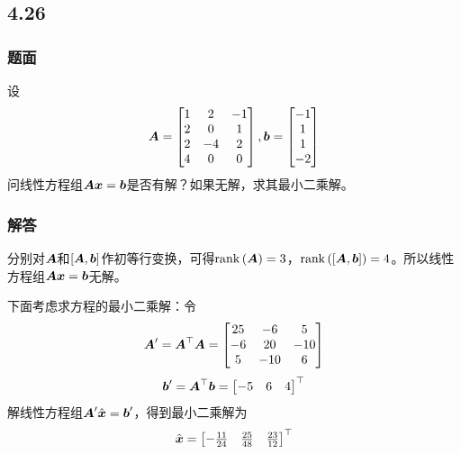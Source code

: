 \documentclass{beamer}
\begin{document}
\subsection*{4.26}
\begin{frame}
    \frametitle{题面}
    设
    \begin{equation*}
        \boldsymbol{A}=
        \begin{bmatrix}
            1 & 2  & -1 \\
            2 & 0  & 1  \\
            2 & -4 & 2  \\
            4 & 0  & 0
        \end{bmatrix},
        \boldsymbol{b}=\begin{bmatrix}-1\\1\\1\\-2\end{bmatrix}
    \end{equation*}
    问线性方程组\(\boldsymbol{A}\boldsymbol{x}=\boldsymbol{b}\)是否有解？如果无解，求其最小二乘解。
\end{frame}

\begin{frame}
    \frametitle{解答}
    分别对\(\boldsymbol{A}\)和\(\left[ \boldsymbol{A},\boldsymbol{b} \right]\)作初等行变换，可得\(\mathrm{rank}\left( \boldsymbol{A} \right)=3\)，\(\mathrm{rank}\left( \left[ \boldsymbol{A},\boldsymbol{b} \right] \right)=4\)。所以线性方程组\(\boldsymbol{A}\boldsymbol{x}=\boldsymbol{b}\)无解。

    下面考虑求方程的最小二乘解：令
    \begin{equation*}
        \boldsymbol{A}'=\boldsymbol{A}^\top\boldsymbol{A}=
        \begin{bmatrix}
            25 & -6  & 5   \\
            -6 & 20  & -10 \\
            5  & -10 & 6
        \end{bmatrix}
    \end{equation*}
    \begin{equation*}
        \boldsymbol{b}'=\boldsymbol{A}^\top\boldsymbol{b}=\begin{bmatrix}-5&6&4\end{bmatrix}^\top
    \end{equation*}
    解线性方程组\(\boldsymbol{A}'\hat{\boldsymbol{x}}=\boldsymbol{b}'\)，得到最小二乘解为
    \begin{equation*}
        \hat{\boldsymbol{x}}=
        \begin{bmatrix}
            -\frac{11}{24} & \frac{25}{48} & \frac{23}{12}
        \end{bmatrix}^\top
    \end{equation*}
\end{frame}
\end{document}
